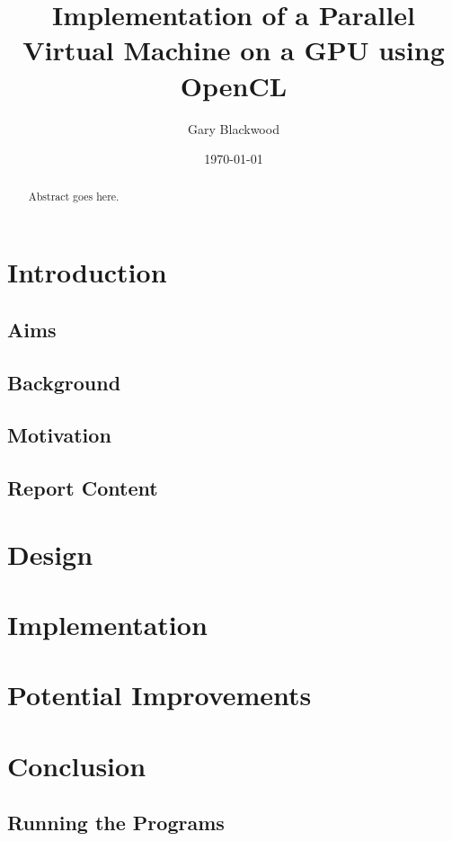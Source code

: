 \documentclass{l4proj}
\title{Implementation of a Parallel Virtual Machine on a GPU using OpenCL}
\author{Gary Blackwood}
\date{\today}
\begin{document}
\maketitle

\begin{abstract}
Abstract goes here.
\end{abstract}

\educationalconsent

\tableofcontents


\chapter{Introduction}

\section{Aims}

\section{Background}

\section{Motivation}

\section{Report Content}

\chapter{Design}

\chapter{Implementation}

\chapter{Potential Improvements}

\chapter{Conclusion}


\begin{appendices}
  \chapter{Running the Programs}
\end{appendices}



\end{document}
